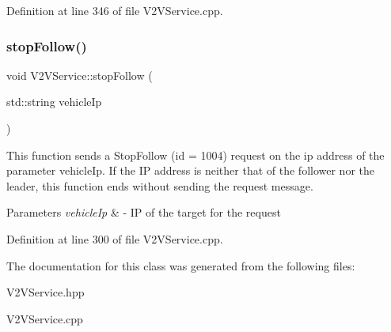 Definition at line 346 of file V2\+V\+Service.\+cpp.

\mbox{\label{class_v2_v_service_ad25bfe4c2a0a170f06a1a1f0bf7965c7}} 
\subsubsection{\texorpdfstring{stop\+Follow()}{stopFollow()}}
{\footnotesize\ttfamily void V2\+V\+Service\+::stop\+Follow (\begin{DoxyParamCaption}\item[{std\+::string}]{vehicle\+Ip }\end{DoxyParamCaption})}

This function sends a Stop\+Follow (id = 1004) request on the ip address of the parameter vehicle\+Ip. If the IP address is neither that of the follower nor the leader, this function ends without sending the request message.


\begin{DoxyParams}{Parameters}
{\em vehicle\+Ip} & -\/ IP of the target for the request \\
\hline
\end{DoxyParams}


Definition at line 300 of file V2\+V\+Service.\+cpp.



The documentation for this class was generated from the following files\+:\begin{DoxyCompactItemize}
\item 
V2\+V\+Service.\+hpp\item 
V2\+V\+Service.\+cpp\end{DoxyCompactItemize}

